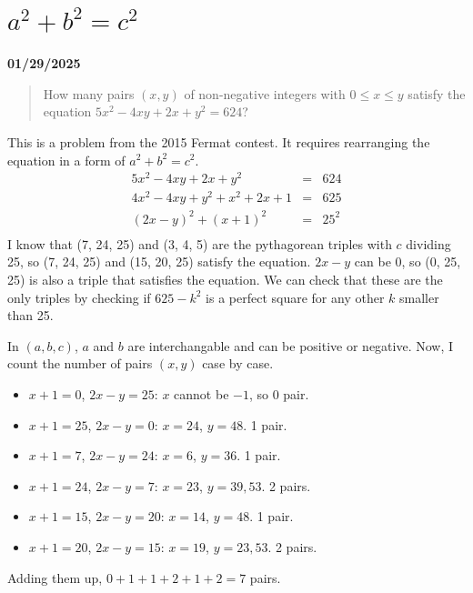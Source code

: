 \documentclass[12pt, oneside]{article}
\begin{document}
\section*{$a^2 + b^2 = c^2$}
\textbf{01/29/2025}
\begin{quote}
How many pairs $(x, y)$ of non-negative integers with $0 \leq x \leq y$ satisfy the equation $5x^2 - 4xy + 2x + y^2 = 624$?
\end{quote}
This is a problem from the 2015 Fermat contest. It requires rearranging the equation in a form of $a^2 + b^2 = c^2$.
\begin{eqnarray*}
5x^2 - 4xy + 2x + y^2 &=& 624\\
4x^2 - 4xy + y^2 + x^2 + 2x + 1&=& 625\\
(2x-y)^2 + (x+1)^2&=& 25^2\\
\end{eqnarray*}
I know that (7, 24, 25) and (3, 4, 5) are the pythagorean triples with $c$ dividing 25, so (7, 24, 25) and (15, 20, 25) satisfy the equation. $2x-y$ can be 0, so (0, 25, 25) is also a triple that satisfies the equation. We can check that these are the only triples by checking if $625 - k^2$ is a perfect square for any other $k$ smaller than 25. 

In $(a, b, c)$, $a$ and $b$ are interchangable and can be positive or negative. Now, I count the number of pairs $(x, y)$ case by case.
\begin{itemize}
\item $x+1 = 0$, $2x-y = 25$: $x$ cannot be $-1$, so 0 pair.
\item $x+1 = 25$, $2x-y = 0$: $x=24$, $y=48$. 1 pair.
\item $x+1 = 7$, $2x-y = 24$: $x=6$, $y=36$. 1 pair.
\item $x+1 = 24$, $2x-y = 7$: $x=23$, $y=39, 53$. 2 pairs.
\item $x+1 = 15$, $2x-y = 20$: $x=14$, $y=48$. 1 pair.
\item $x+1 = 20$, $2x-y = 15$: $x=19$, $y=23, 53$. 2 pairs.
\end{itemize}
Adding them up, $0+1+1+2+1+2=7$ pairs.
\end{document}
